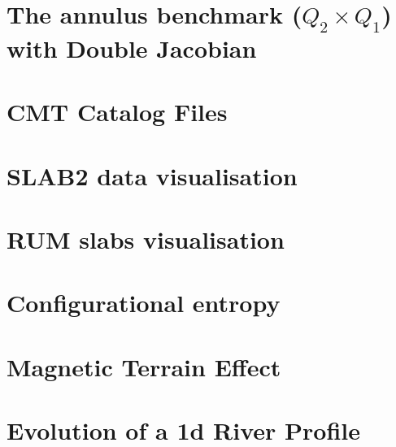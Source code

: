 \documentclass[a4paper,11pt]{report}
\begin{document}
\chapter{The annulus benchmark ($Q_2\times Q_1$) with Double Jacobian \label{133}} %

\chapter{CMT Catalog Files\label{f134}} %

\chapter{SLAB2 data visualisation\label{f135}} %

\chapter{RUM slabs visualisation\label{f136}} %

\chapter{Configurational entropy \label{f137}} %

\chapter{Magnetic Terrain Effect \label{f138}} %

\chapter{Evolution of a 1d River Profile\label{f139}} %
\end{document}
